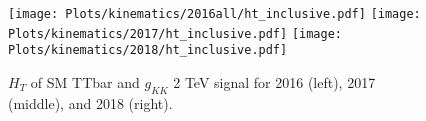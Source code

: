 \begin{figure}[htp]
	\begin{center}

		\texttt{[image: Plots/kinematics/2016all/ht\_inclusive.pdf]}
		\texttt{[image: Plots/kinematics/2017/ht\_inclusive.pdf]}
		\texttt{[image: Plots/kinematics/2018/ht\_inclusive.pdf]}

		\caption{$H_T$ of SM TTbar and $g_{KK}$ 2 TeV signal for 2016 (left), 2017 (middle), and 2018 (right).}
		\label{fig:kin2018_fwdFail1}
	\end{center}
\end{figure}




